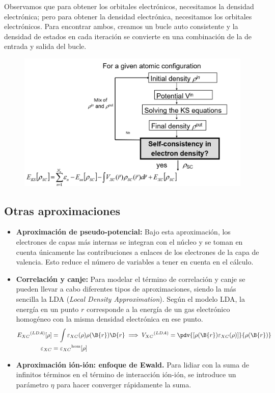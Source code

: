 Observamos que para obtener los orbitales electrónicos, necesitamos la densidad electrónica; pero para obtener la densidad electrónica, necesitamos los orbitales electrónicos. Para encontrar ambos, creamos un bucle auto consistente y la densidad de estados en cada iteración se convierte en una combinación de la de entrada y salida del bucle.
\begin{figure}[h!]
    \centering
    \includegraphics[scale=.4]{FIGURAS/bucle dft.png}
    \label{fig:bucle}
\end{figure}

\subsection{Otras aproximaciones}
\begin{itemize}
    \item \textbf{Aproximación de pseudo-potencial: } Bajo esta aproximación, los electrones de capas más internas se integran con el núcleo y se toman en cuenta únicamente las contribuciones a enlaces de los electrones de la capa de valencia. Esto reduce el número de variables a tener en cuenta en el cálculo.

    \item \textbf{Correlación y canje: }Para modelar el término de correlación y canje se pueden llevar a cabo diferentes tipos de aproximaciones, siendo la más sencilla la LDA (\emph{Local Density Approximation}). Según el modelo LDA, la energía en un punto $r$ corresponde a la energía de un gas electrónico homogéneo con la misma densidad electrónica en ese punto.
    \begin{equation*}
        \begin{split}
            E_{XC}{}^{(LDA)}[\rho ]&=\int \varepsilon_{XC} (\rho) \rho(\B{r}) \D{r} \implies V_{XC}{}^{(LDA)}=\pdv{[\rho(\B{r})\varepsilon_{XC}(\rho)]}{\rho(\B{r})}\\
            \varepsilon_{XC} &= \varepsilon_{XC}{}^\text{hom}[\rho]
        \end{split}
    \end{equation*}

    \item \textbf{Aproximación ión-ión: enfoque de Ewald.} Para lidiar con la suma de infinitos términos en el término de interacción ión-ión, se introduce un parámetro $\eta$ para hacer converger rápidamente la suma.
\end{itemize}